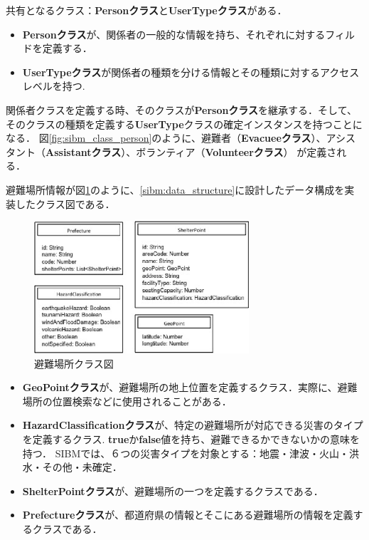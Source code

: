 共有となるクラス：\textbf{Personクラス}と\textbf{UserTypeクラス}がある．

\begin{itemize}
  \item \textbf{Personクラス}が、関係者の一般的な情報を持ち、それぞれに対するフィルドを定義する．
  \item \textbf{UserTypeクラス}が関係者の種類を分ける情報とその種類に対するアクセスレベルを持つ.
\end{itemize}

関係者クラスを定義する時、そのクラスが\textbf{Personクラス}を継承する．そして、そのクラスの種類を定義する\textbf{UserType}クラスの確定インスタンスを持つことになる．
図\ref{fig:sibm_class_person}のように、避難者（\textbf{Evacueeクラス}）、アシスタント（\textbf{Assistantクラス}）、ボランティア（\textbf{Volunteerクラス}）
が定義される．

避難場所情報が図\ref{fig:sibm_class_shelter}のように、\ref{sibm:data_structure}に設計したデータ構成を実装したクラス図である．

\begin{figure}[h!]
 	\begin{center}
 		\includegraphics[width=80mm]{./images/class_shelter.eps}
 		\caption{避難場所クラス図}
 		\label{fig:sibm_class_shelter}
 	\end{center}
\end{figure}

\begin{itemize}
  \item \textbf{GeoPointクラス}が、避難場所の地上位置を定義するクラス．実際に、避難場所の位置検索などに使用されることがある．
  \item
  \textbf{HazardClassificationクラス}が、特定の避難場所が対応できる災害のタイプを定義するクラス.
  \textbf{true}か\textbf{false}値を持ち、避難できるかできないかの意味を持つ．
  SIBMでは、６つの災害タイプを対象とする：地震・津波・火山・洪水・その他・未確定．
  \item \textbf{ShelterPointクラス}が、避難場所の一つを定義するクラスである．
  \item \textbf{Prefectureクラス}が、都道府県の情報とそこにある避難場所の情報を定義するクラスである．
\end{itemize}

